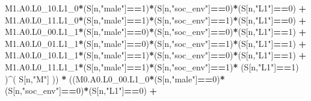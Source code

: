 \documentclass[
]{book}
\newenvironment{Shaded}{\begin{snugshade}}{\end{snugshade}}
\newcommand{\DecValTok}[1]{\textcolor[rgb]{0.00,0.00,0.81}{#1}}
\newcommand{\NormalTok}[1]{#1}
\newcommand{\SpecialCharTok}[1]{\textcolor[rgb]{0.81,0.36,0.00}{\textbf{#1}}}
\newcommand{\StringTok}[1]{\textcolor[rgb]{0.31,0.60,0.02}{#1}}
\begin{document}
\begin{Shaded}
\begin{Highlighting}[]
\NormalTok{          M1.A0.L0\_10.L1\_0}\SpecialCharTok{*}\NormalTok{(S[n,}\StringTok{"male"}\NormalTok{]}\SpecialCharTok{==}\DecValTok{1}\NormalTok{)}\SpecialCharTok{*}\NormalTok{(S[n,}\StringTok{"soc\_env"}\NormalTok{]}\SpecialCharTok{==}\DecValTok{0}\NormalTok{)}\SpecialCharTok{*}\NormalTok{(S[n,}\StringTok{"L1"}\NormalTok{]}\SpecialCharTok{==}\DecValTok{0}\NormalTok{) }\SpecialCharTok{+} 
\NormalTok{          M1.A0.L0\_11.L1\_0}\SpecialCharTok{*}\NormalTok{(S[n,}\StringTok{"male"}\NormalTok{]}\SpecialCharTok{==}\DecValTok{1}\NormalTok{)}\SpecialCharTok{*}\NormalTok{(S[n,}\StringTok{"soc\_env"}\NormalTok{]}\SpecialCharTok{==}\DecValTok{1}\NormalTok{)}\SpecialCharTok{*}\NormalTok{(S[n,}\StringTok{"L1"}\NormalTok{]}\SpecialCharTok{==}\DecValTok{0}\NormalTok{) }\SpecialCharTok{+}
\NormalTok{          M1.A0.L0\_00.L1\_1}\SpecialCharTok{*}\NormalTok{(S[n,}\StringTok{"male"}\NormalTok{]}\SpecialCharTok{==}\DecValTok{0}\NormalTok{)}\SpecialCharTok{*}\NormalTok{(S[n,}\StringTok{"soc\_env"}\NormalTok{]}\SpecialCharTok{==}\DecValTok{0}\NormalTok{)}\SpecialCharTok{*}\NormalTok{(S[n,}\StringTok{"L1"}\NormalTok{]}\SpecialCharTok{==}\DecValTok{1}\NormalTok{) }\SpecialCharTok{+}
\NormalTok{          M1.A0.L0\_01.L1\_1}\SpecialCharTok{*}\NormalTok{(S[n,}\StringTok{"male"}\NormalTok{]}\SpecialCharTok{==}\DecValTok{0}\NormalTok{)}\SpecialCharTok{*}\NormalTok{(S[n,}\StringTok{"soc\_env"}\NormalTok{]}\SpecialCharTok{==}\DecValTok{1}\NormalTok{)}\SpecialCharTok{*}\NormalTok{(S[n,}\StringTok{"L1"}\NormalTok{]}\SpecialCharTok{==}\DecValTok{1}\NormalTok{) }\SpecialCharTok{+}
\NormalTok{          M1.A0.L0\_10.L1\_1}\SpecialCharTok{*}\NormalTok{(S[n,}\StringTok{"male"}\NormalTok{]}\SpecialCharTok{==}\DecValTok{1}\NormalTok{)}\SpecialCharTok{*}\NormalTok{(S[n,}\StringTok{"soc\_env"}\NormalTok{]}\SpecialCharTok{==}\DecValTok{0}\NormalTok{)}\SpecialCharTok{*}\NormalTok{(S[n,}\StringTok{"L1"}\NormalTok{]}\SpecialCharTok{==}\DecValTok{1}\NormalTok{) }\SpecialCharTok{+}
\NormalTok{          M1.A0.L0\_11.L1\_1}\SpecialCharTok{*}\NormalTok{(S[n,}\StringTok{"male"}\NormalTok{]}\SpecialCharTok{==}\DecValTok{1}\NormalTok{)}\SpecialCharTok{*}\NormalTok{(S[n,}\StringTok{"soc\_env"}\NormalTok{]}\SpecialCharTok{==}\DecValTok{1}\NormalTok{)}\SpecialCharTok{*}
\NormalTok{          (S[n,}\StringTok{"L1"}\NormalTok{]}\SpecialCharTok{==}\DecValTok{1}\NormalTok{) )}\SpecialCharTok{\^{}}\NormalTok{( S[n,}\StringTok{"M"}\NormalTok{] )) }\SpecialCharTok{*}
\NormalTok{      ((M0.A0.L0\_00.L1\_0}\SpecialCharTok{*}\NormalTok{(S[n,}\StringTok{"male"}\NormalTok{]}\SpecialCharTok{==}\DecValTok{0}\NormalTok{)}\SpecialCharTok{*}\NormalTok{(S[n,}\StringTok{"soc\_env"}\NormalTok{]}\SpecialCharTok{==}\DecValTok{0}\NormalTok{)}\SpecialCharTok{*}\NormalTok{(S[n,}\StringTok{"L1"}\NormalTok{]}\SpecialCharTok{==}\DecValTok{0}\NormalTok{) }\SpecialCharTok{+}               

\end{Highlighting}
\end{Shaded}
\end{document}
